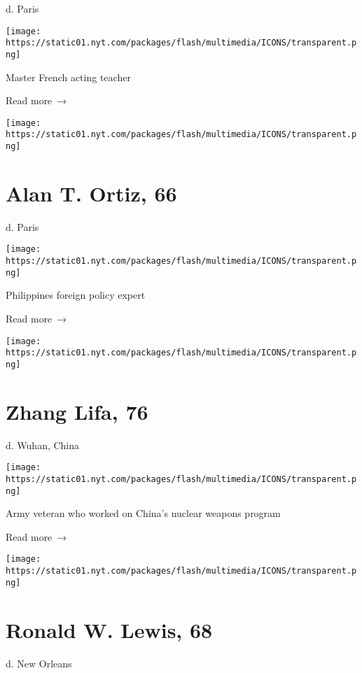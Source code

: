 d. Paris

\texttt{[image: https://static01.nyt.com/packages/flash/multimedia/ICONS/transparent.png]}

Master French acting teacher

 Read more~→

\href{https://www.nytimes.com/2020/04/10/obituaries/alan-ortiz-dead-coronavirus.html}{}

\texttt{[image: https://static01.nyt.com/packages/flash/multimedia/ICONS/transparent.png]}

\hypertarget{alan-t-ortiz-66}{%
\section{Alan T. Ortiz, 66}\label{alan-t-ortiz-66}}

d. Paris

\texttt{[image: https://static01.nyt.com/packages/flash/multimedia/ICONS/transparent.png]}

Philippines foreign policy expert

 Read more~→

\href{https://www.nytimes.com/2020/04/10/obituaries/zhang-lifa-dead-coronavirus.html}{}

\texttt{[image: https://static01.nyt.com/packages/flash/multimedia/ICONS/transparent.png]}

\hypertarget{zhang-lifa-76}{%
\section{Zhang Lifa, 76}\label{zhang-lifa-76}}

d. Wuhan, China

\texttt{[image: https://static01.nyt.com/packages/flash/multimedia/ICONS/transparent.png]}

Army veteran who worked on China's nuclear weapons program

 Read more~→

\href{https://www.nytimes.com/2020/04/09/us/ronald-w-lewis-dead-coronavirus.html}{}

\texttt{[image: https://static01.nyt.com/packages/flash/multimedia/ICONS/transparent.png]}

\hypertarget{ronald-w-lewis-68}{%
\section{Ronald W. Lewis, 68}\label{ronald-w-lewis-68}}

d. New Orleans

